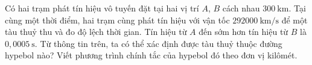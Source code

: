 \begin{bt}%
	Có hai trạm phát tín hiệu vô tuyến đặt tại hai vị trí $A$, $B$ cách nhau $300 \mathrm{~km}$. Tại cùng một thời điểm, hai trạm cùng phát tín hiệu với vận tốc $292000 \mathrm{~km} / \mathrm{s}$ để một tàu thuỷ thu và đo độ lệch thời gian. Tín hiệu từ $A$ đến sớm hơn tín hiệu từ $B$ là $0,0005 \mathrm{~s}$. Từ thông tin trên, ta có thể xác định được tàu thuỷ thuộc đường hypebol nào? Viết phương trình chính tắc của hypebol đó theo đơn vị kilômét.
\end{bt}

